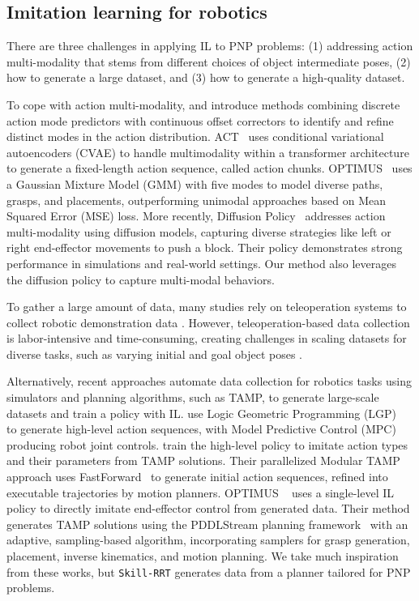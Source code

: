 \subsection{Imitation learning for robotics}
There are three challenges in applying IL to PNP problems: (1) addressing action multi-modality that stems from different choices of object intermediate poses, (2) how to generate a large dataset, and (3) how to generate a high-quality dataset. 

To cope with action multi-modality, \citet{lee2024behavior} and \citet{shafiullah2022behavior} introduce methods combining discrete action mode predictors with continuous offset correctors to identify and refine distinct modes in the action distribution. ACT~\cite{Zhao-RSS-23} uses conditional variational autoencoders (CVAE) to handle multimodality within a transformer architecture to generate a fixed-length action sequence, called action chunks. OPTIMUS~\cite{dalal2023imitating} uses a Gaussian Mixture Model (GMM) with five modes to model diverse paths, grasps, and placements, outperforming unimodal approaches based on Mean Squared Error (MSE) loss. More recently, Diffusion Policy~\cite{chi2023diffusion} addresses action multi-modality using diffusion models, capturing diverse strategies like left or right end-effector movements to push a block. Their policy demonstrates strong performance in simulations and real-world settings. Our method also leverages the diffusion policy to capture multi-modal behaviors.

To gather a large amount of data, many studies rely on teleoperation systems to collect robotic demonstration data \cite{handa2020dexpilot, heo2023furniturebench, mandlekar2018roboturk, mandlekar2019scaling, mandlekar2020human, stepputtis2022system, Zhao-RSS-23}. However, teleoperation-based data collection is labor-intensive and time-consuming, creating challenges in scaling datasets for diverse tasks, such as varying initial and goal object poses \cite{brohan2022rt, dalal2023imitating, jang2022bc, xiang2019task, yang2021trail}. 

Alternatively, recent approaches automate data collection for robotics tasks using simulators and planning algorithms, such as TAMP, to generate large-scale datasets and train a policy with IL. \citet{driess2021learning} use Logic Geometric Programming (LGP)~\cite{toussaint2018differentiable} to generate high-level action sequences, with Model Predictive Control (MPC) producing robot joint controls.  \citet{mcdonald2022guided} train the high-level policy to imitate action types and their parameters from TAMP solutions. Their parallelized Modular TAMP approach uses FastForward~\cite{hoffmann2001ff} to generate initial action sequences, refined into executable trajectories by motion planners. OPTIMUS ~\cite{dalal2023imitating} uses a single-level IL policy to directly imitate end-effector control from generated data. Their method generates TAMP solutions using the PDDLStream planning framework~\cite{garrett2020pddlstream} with an adaptive, sampling-based algorithm, incorporating samplers for grasp generation, placement, inverse kinematics, and motion planning. We take much inspiration from these works, but \texttt{Skill-RRT} generates data from a planner tailored for PNP problems.

